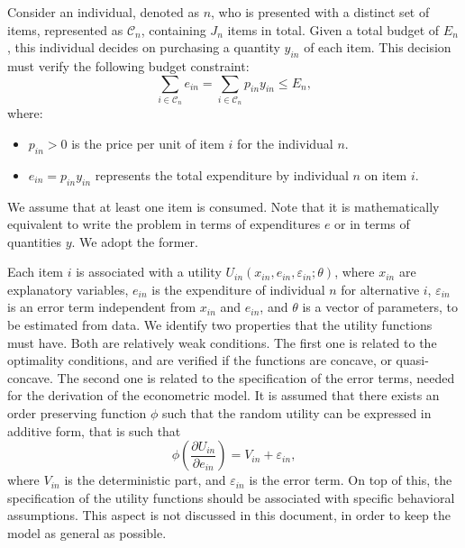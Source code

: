 \documentclass[12pt,a4paper]{article}
\begin{document}
Consider an individual, denoted as $n$, who is presented with a
distinct set of items, represented as $\mathcal{C}_n$, containing
$J_n$ items in total. Given a total budget of $E_n$, this individual
decides on purchasing a quantity $y_{in}$ of each item. This decision
must verify the following budget constraint:
\[
\sum_{i \in \mathcal{C}_n} e_{in} = \sum_{i \in \mathcal{C}_n} p_{in} y_{in} \leq E_n,
\]
where:
\begin{itemize}
    \item $p_{in} > 0$ is the price per unit of item $i$ for the individual $n$.
    \item $e_{in} = p_{in} y_{in}$ represents the total expenditure by individual $n$ on item $i$.
\end{itemize}
We assume that at least one item is consumed. Note that it is mathematically equivalent
to write the problem in terms of expenditures $e$ or in terms of quantities $y$. We adopt the former.


Each item $i$ is associated with a utility $U_{in}(x_{in}, e_{in}, \varepsilon_{in}; \theta)$, where $x_{in}$ are explanatory variables,
$e_{in}$ is the expenditure of individual $n$ for alternative $i$, $\varepsilon_{in}$ is an error term independent from $x_{in}$ and $e_{in}$, and $\theta$ is a vector of parameters, to be estimated from data.
We identify two
properties that the utility functions must have. Both are relatively
weak conditions. The first one is related to the optimality
conditions, and are verified if the functions are concave, or
quasi-concave. The second one is related to the specification of the
error terms, needed for the derivation of the econometric model.
It is assumed that there exists an order preserving function $\phi$ such that the random utility can be expressed in additive form, that is such that
\begin{equation}
    \label{eq:phi}
\phi\left(\frac{\partial U_{in}}{\partial e_{in}}\right) = V_{in} + \varepsilon_{in},
\end{equation}
where $V_{in}$ is the deterministic part, and $\varepsilon_{in}$ is the error term.
On
top of this, the specification of the utility functions should be
associated with specific behavioral assumptions. This aspect is not discussed in this document, in order to keep the model as general as possible. 
\end{document}
